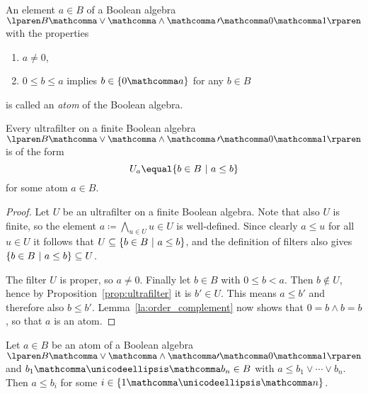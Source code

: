 \medskip

\begin{definition}
  An element $a \in B$ of a Boolean algebra
  $\lparen B \mathcomma \vee \mathcomma \wedge \mathcomma \, \prime
  \mathcomma 0 \mathcomma 1 \rparen$
  with the properties
  \begin{enumerate}
    \item $a \ne 0$,
    \item $0 \leq b \leq a$ implies $b \in \lbrace 0 \mathcomma a \rbrace$
    for any $b \in B$
  \end{enumerate}
  is called an \emph{atom} of the Boolean algebra.
\end{definition}

\begin{proposition}
\label{prop:finite_ultrafilter}
  Every ultrafilter on a finite Boolean algebra
  $\lparen B \mathcomma \vee \mathcomma \wedge \mathcomma \, \prime
  \mathcomma 0 \mathcomma 1 \rparen$
  is of the form
  \[
    U_a
    \equal
    \lbrace b \in B \pipe a \leq b \rbrace
  \]
  for some atom $a \in B$.
\end{proposition}

\begin{proof}
  Let $U$ be an ultrafilter on a finite Boolean algebra.
  Note that also $U$ is finite,
  so the element $a \coloneq \bigwedge_{ u \in U } u \in U$
  is well-defined.
  Since clearly $a \leq u$ for all $u \in U$
  it follows that
  $U \subseteq \lbrace b \in B \ \vert\  a \leq b \rbrace$,
  and the definition of filters also gives
  $\lbrace b \in B \ \vert\  a \leq b \rbrace \subseteq U$.

  The filter $U$ is proper, so $a \ne 0$.
  Finally let $b \in B$ with $0 \leq b \less a$.
  Then $b \notin U$,
  hence by Proposition~\ref{prop:ultrafilter} it is $b \prime \in U$.
  This means $a \leq b \prime$ and therefore also $b \leq b \prime$.
  Lemma~\ref{la:order_complement} now shows that
  $0 \equal b \wedge b \equal b$,
  so that $a$ is an atom.
\end{proof}

\begin{lemma}
\label{la:atom_join}
  Let $a \in B$ be an atom of a Boolean algebra
  $\lparen B \mathcomma \vee \mathcomma \wedge \mathcomma \prime
  \mathcomma 0 \mathcomma 1 \rparen$
  and $b_1 \mathcomma \unicodeellipsis \mathcomma b_n \in B$ with
  $a \leq b_1 \vee \cdots \vee b_n$.
  Then $a \leq b_i$
  for some
  $i \in \lbrace 1 \mathcomma \unicodeellipsis \mathcomma n \rbrace$.
\end{lemma}


